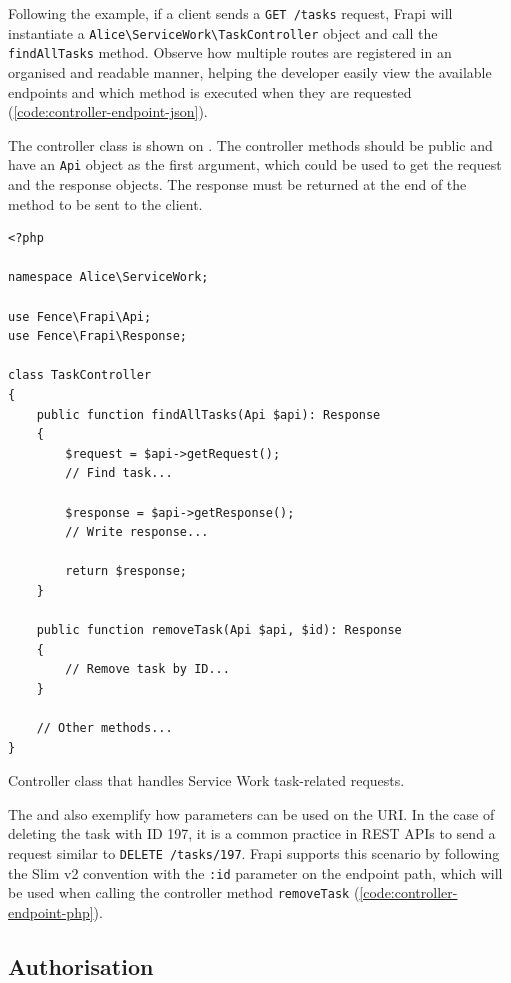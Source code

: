 Following the example, if a client sends a \texttt{GET /tasks} request, Frapi will instantiate a \texttt{Alice\textbackslash ServiceWork\textbackslash TaskController} object and call the \texttt{findAllTasks} method. Observe how multiple routes are registered in an organised and readable manner, helping the developer easily view the available endpoints and which method is executed when they are requested (\autoref{code:controller-endpoint-json}).

The controller class is shown on . The controller methods should be public and have an \texttt{Api} object as the first argument, which could be used to get the request and the response objects. The response must be returned at the end of the method to be sent to the client.

\begin{listing}[htbp]
\begin{verbatim}
<?php

namespace Alice\ServiceWork;

use Fence\Frapi\Api;
use Fence\Frapi\Response;

class TaskController
{
	public function findAllTasks(Api $api): Response
	{
		$request = $api->getRequest();
		// Find task...

		$response = $api->getResponse();
		// Write response...

		return $response;
	}

	public function removeTask(Api $api, $id): Response
	{
		// Remove task by ID...
	}

	// Other methods...
}
\end{verbatim}
\caption{Controller class that handles Service Work task-related requests.}
\label{code:controller-endpoint-php}
\end{listing}

The  and  also exemplify how parameters can be used on the URI. In the case of deleting the task with ID 197, it is a common practice in REST APIs to send a request similar to \texttt{DELETE /tasks/197}. Frapi supports this scenario by following the Slim v2 convention \cite{slim-v2-routing-params} with the \texttt{:id} parameter on the endpoint path, which will be used when calling the controller method \texttt{removeTask} (\autoref{code:controller-endpoint-php}).

\subsection{Authorisation}

